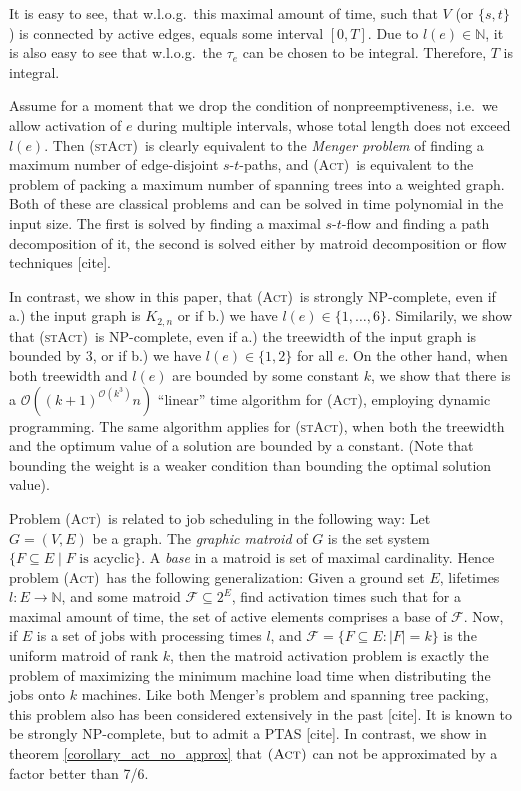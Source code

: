 \documentclass[10pt,a4paper]{article}
\numberwithin{equation}{section}
\newcommand{\N}{\mathbb{N}}
\newcommand{\set}[1]{\{ #1 \}}
\newcommand{\fromto}[2]{\set{#1, \ldots, #2}}
\newcommand{\bigO}{\mathcal{O}}
\newcommand{\act}{\textsc{(Act)}}
\newcommand{\stact}{\textsc{(stAct)}}
\begin{document}
It is easy to see, that w.l.o.g.\ this maximal amount of time, such that $V$ (or $\set{s,t}$) is connected by active edges, equals some interval $[0, T]$. Due to $l(e) \in \N$, it is also easy to see that w.l.o.g.\ the $\tau_e$ can be chosen to be integral. Therefore, $T$ is integral.

Assume for a moment that we drop the condition of nonpreemptiveness, i.e.\ we allow activation of $e$ during multiple intervals, whose total length does not exceed $l(e)$. Then \stact\ is clearly equivalent to the \emph{Menger problem} of finding a maximum number of edge-disjoint $s$-$t$-paths, and \act\ is equivalent to the problem of packing a maximum number of spanning trees into a weighted graph. Both of these are classical problems and can be solved in time polynomial in the input size. The first is solved by finding a maximal $s$-$t$-flow and finding a path decomposition of it, the second is solved either by matroid decomposition or flow techniques [cite]. 

In contrast, we show in this paper, that \act\ is strongly NP-complete, even if a.) the input graph is $K_{2,n}$ or if b.) we have $l(e) \in \fromto{1}{6}$. Similarily, we show that \stact\ is NP-complete, even if a.) the treewidth of the input graph is bounded by 3, or if b.) we have $l(e) \in \set{1,2}$ for all $e$. On the other hand, when both treewidth and $l(e)$ are bounded by some constant $k$, we show that there is a $\bigO((k+1)^{\bigO(k^3)}n)$ \enquote{linear} time algorithm for \act, employing dynamic programming. The same algorithm applies for \stact, when both the treewidth and the optimum value of a solution are bounded by a constant. (Note that bounding the weight is a weaker condition than bounding the optimal solution value).

Problem \act\ is related to job scheduling in the following way: Let $G = (V, E)$ be a graph. The \emph{graphic matroid} of $G$ is the set system $\set{F \subseteq E \mid F \text{ is acyclic}}$. A \emph{base} in a matroid is set of maximal cardinality. Hence problem \act\ has the following generalization: Given a ground set $E$, lifetimes $l: E \rightarrow \N$, and some matroid $\mathcal{F} \subseteq 2^E$, find activation times such that for a maximal amount of time, the set of active elements comprises a base of $\mathcal{F}$. Now, if $E$ is a set of jobs with processing times $l$, and $\mathcal{F} = \set{F \subseteq E : |F| = k}$ is the uniform matroid of rank $k$, then the matroid activation problem is exactly the problem of maximizing the minimum machine load time when distributing the jobs onto $k$ machines. Like both Menger's problem and spanning tree packing, this problem also has been considered extensively in the past [cite]. It is known to be strongly NP-complete, but to admit a PTAS [cite]. In contrast, we show in theorem \cref{corollary_act_no_approx} that $\act$ can not be approximated by a factor better than 7/6.
\end{document}
